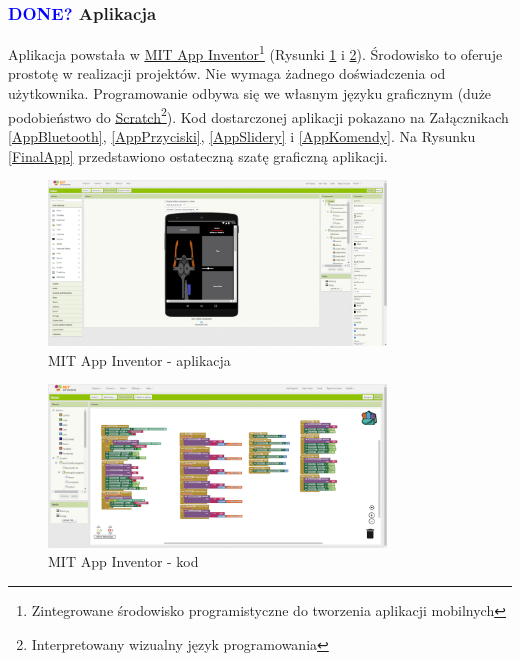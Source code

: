 \documentclass[11pt,titlepage,a4paper]{article}
\begin{document}
\subsubsection{\textcolor{blue}{DONE?} Aplikacja}

Aplikacja powstała w \href{https://appinventor.mit.edu}{\underline{MIT App Inventor}}\footnote{Zintegrowane środowisko programistyczne do tworzenia aplikacji mobilnych} (Rysunki \ref{MITapp} i \ref{MITblocks}). Środowisko to oferuje prostotę w realizacji projektów. Nie wymaga żadnego doświadczenia od użytkownika. Programowanie odbywa się we własnym języku graficznym (duże podobieństwo do \href{https://scratch.mit.edu}{\underline{Scratch}}\footnote{Interpretowany wizualny język programowania}). Kod dostarczonej aplikacji pokazano na Załącznikach \ref{AppBluetooth}, \ref{AppPrzyciski}, \ref{AppSlidery} i \ref{AppKomendy}. Na Rysunku \ref{FinalApp} przedstawiono ostateczną szatę graficzną aplikacji.

\begin{figure}[h!]
    \begin{center}
        \includegraphics[width=0.8\textwidth]{img/app_src/MITapp.png}
    \end{center}
    \caption{MIT App Inventor - aplikacja}
    \label{MITapp}
\end{figure}

\begin{figure}[h!]
    \begin{center}
        \includegraphics[width=0.8\textwidth]{img/app_src/MITblocks.png}
    \end{center}
    \caption{MIT App Inventor - kod}
    \label{MITblocks}
\end{figure}
\end{document}
